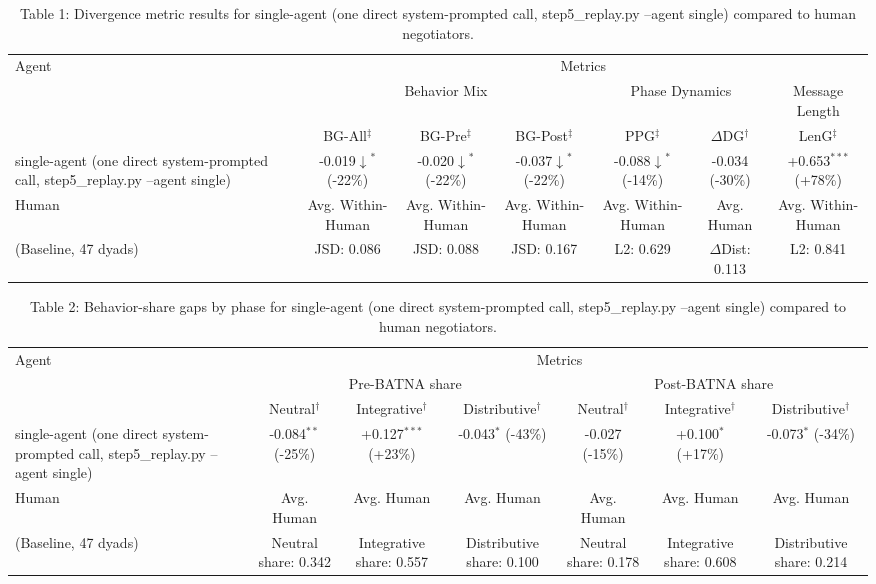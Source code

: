 \begin{table}[t]
\centering
\begin{tabular}{lcccccc}
\toprule
\multirow{3}{*}{Agent} & \multicolumn{6}{c}{Metrics} \\
\cmidrule(lr){2-7}
 & \multicolumn{3}{c}{Behavior Mix} & \multicolumn{2}{c}{Phase Dynamics} & \multicolumn{1}{c}{Message Length} \\
\cmidrule(lr){2-4} \cmidrule(lr){5-6} \cmidrule(lr){7-7}
 & BG-All$^\ddagger$ & BG-Pre$^\ddagger$ & BG-Post$^\ddagger$ & PPG$^\ddagger$ & $\Delta$DG$^\dagger$ & LenG$^\ddagger$ \\
\midrule
single-agent (one direct system-prompted call, step5_replay.py --agent single) & -0.019$\downarrow$$^{*}$ (-22\%) & -0.020$\downarrow$$^{*}$ (-22\%) & -0.037$\downarrow$$^{*}$ (-22\%) & -0.088$\downarrow$$^{*}$ (-14\%) & -0.034 (-30\%) & +0.653$^{***}$ (+78\%) \\
\midrule
Human & Avg. Within-Human & Avg. Within-Human & Avg. Within-Human & Avg. Within-Human & Avg. Human & Avg. Within-Human \\
(Baseline, 47 dyads) & JSD: 0.086 & JSD: 0.088 & JSD: 0.167 & L2: 0.629 & $\Delta$Dist: 0.113 & L2: 0.841 \\
\bottomrule
\end{tabular}
\caption{Table 1: Divergence metric results for single-agent (one direct system-prompted call, step5_replay.py --agent single) compared to human negotiators.}
\end{table}

\begin{table}[t]
\centering
\begin{tabular}{lcccccc}
\toprule
\multirow{3}{*}{Agent} & \multicolumn{6}{c}{Metrics} \\
\cmidrule(lr){2-7}
 & \multicolumn{3}{c}{Pre-BATNA share} & \multicolumn{3}{c}{Post-BATNA share} \\
\cmidrule(lr){2-4} \cmidrule(lr){5-7}
 & Neutral$^\dagger$ & Integrative$^\dagger$ & Distributive$^\dagger$ & Neutral$^\dagger$ & Integrative$^\dagger$ & Distributive$^\dagger$ \\
\midrule
single-agent (one direct system-prompted call, step5_replay.py --agent single) & -0.084$^{**}$ (-25\%) & +0.127$^{***}$ (+23\%) & -0.043$^{*}$ (-43\%) & -0.027 (-15\%) & +0.100$^{*}$ (+17\%) & -0.073$^{*}$ (-34\%) \\
\midrule
Human & Avg. Human & Avg. Human & Avg. Human & Avg. Human & Avg. Human & Avg. Human \\
(Baseline, 47 dyads) & Neutral share: 0.342 & Integrative share: 0.557 & Distributive share: 0.100 & Neutral share: 0.178 & Integrative share: 0.608 & Distributive share: 0.214 \\
\bottomrule
\end{tabular}
\caption{Table 2: Behavior-share gaps by phase for single-agent (one direct system-prompted call, step5_replay.py --agent single) compared to human negotiators.}
\end{table}
